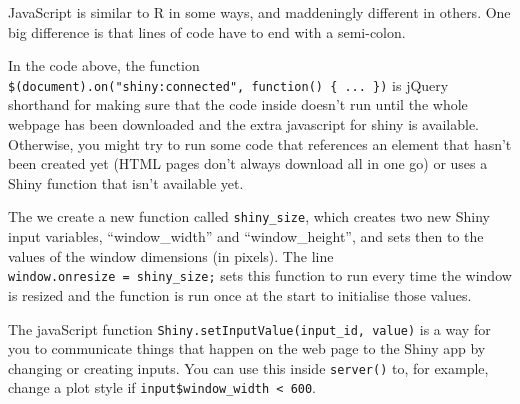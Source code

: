 \documentclass[
]{book}
\newenvironment{Shaded}{\begin{snugshade}}{\end{snugshade}}
\newcommand{\AttributeTok}[1]{\textcolor[rgb]{0.77,0.63,0.00}{#1}}
\newcommand{\BuiltInTok}[1]{#1}
\newcommand{\CommentTok}[1]{\textcolor[rgb]{0.56,0.35,0.01}{\textit{#1}}}
\newcommand{\FunctionTok}[1]{\textcolor[rgb]{0.00,0.00,0.00}{#1}}
\newcommand{\KeywordTok}[1]{\textcolor[rgb]{0.13,0.29,0.53}{\textbf{#1}}}
\newcommand{\NormalTok}[1]{#1}
\newcommand{\OperatorTok}[1]{\textcolor[rgb]{0.81,0.36,0.00}{\textbf{#1}}}
\newcommand{\StringTok}[1]{\textcolor[rgb]{0.31,0.60,0.02}{#1}}
\begin{document}
\begin{Shaded}
\end{Shaded}

JavaScript is similar to R in some ways, and maddeningly different in others. One big difference is that lines of code have to end with a semi-colon.

In the code above, the function \texttt{\$(document).on("shiny:connected",\ function()\ \{\ ...\ \})} is jQuery shorthand for making sure that the code inside doesn't run until the whole webpage has been downloaded and the extra javascript for shiny is available. Otherwise, you might try to run some code that references an element that hasn't been created yet (HTML pages don't always download all in one go) or uses a Shiny function that isn't available yet.

The we create a new function called \texttt{shiny\_size}, which creates two new Shiny input variables, ``window\_width'' and ``window\_height'', and sets then to the values of the window dimensions (in pixels). The line \texttt{window.onresize\ =\ shiny\_size;} sets this function to run every time the window is resized and the function is run once at the start to initialise those values.

The javaScript function \texttt{Shiny.setInputValue(input\_id,\ value)} is a way for you to communicate things that happen on the web page to the Shiny app by changing or creating inputs. You can use this inside \texttt{server()} to, for example, change a plot style if \texttt{input\$window\_width\ \textless{}\ 600}.
\end{document}
